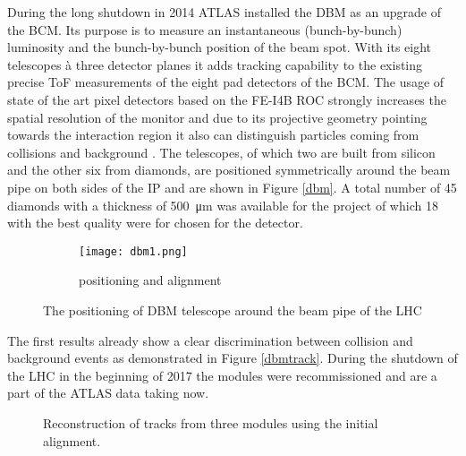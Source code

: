 During the long shutdown in 2014 ATLAS installed the \ac{DBM} as an upgrade of the \ac{BCM}. Its purpose is to measure an instantaneous (bunch-by-bunch) luminosity and the bunch-by-bunch position of the beam spot. With its eight telescopes à three detector planes it adds tracking capability to the existing precise \ac{ToF} measurements of the eight pad detectors of the \ac{BCM}. The usage of state of the art pixel detectors based on the FE-I4B \ac{ROC} \cite{malte} strongly increases the spatial resolution of the monitor and due to its projective geometry pointing towards the interaction region it also can distinguish particles coming from collisions and background \cite{dbm}. The telescopes, of which two are built from silicon and the other six from \pcvd diamonds, are positioned symmetrically around the beam pipe on both sides of the \ac{IP} and are shown in Figure \vref{dbm}. A total number of 45 diamonds with a thickness of \SI{500}{\micro\meter} was available for the project of which 18 with the best quality were for chosen for the detector.

\begin{figure}
	\centering
	\begin{subfigure}{.66\textwidth}
		\centering
		\vspace*{.05\textheight}
		\texttt{[image: dbm1.png]}
		\vspace*{.02\textheight}
		\caption{positioning and alignment}
	\end{subfigure}
	\caption{The positioning of \ac{DBM} telescope around the beam pipe of the \ac{LHC}}
	\label{dbm}
\end{figure}

\noindent
The first results already show a clear discrimination between collision and background events as demonstrated in Figure \vref{dbmtrack}. During the shutdown of the \ac{LHC} in the beginning of 2017 the modules were recommissioned and are a part of the ATLAS data taking now.

\begin{figure}
	\centering
	\caption{Reconstruction of tracks from three modules using the initial alignment.}
	\label{dbmtrack}
\end{figure}

